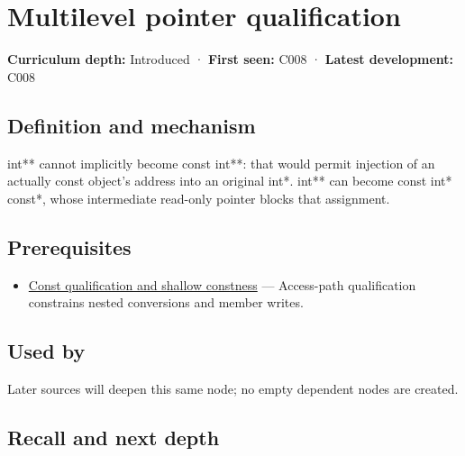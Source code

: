 \hypertarget{appendix-5e1a7561cd98}{}\label{referencestart:appendix-5e1a7561cd98}
\section{Multilevel pointer qualification}\label{appendix-5e1a7561cd98-multilevel-pointer-qualification}

\textbf{Curriculum depth:} Introduced · \textbf{First seen:} C008 · \textbf{Latest development:} C008

\begin{allmightroledefinition}

\subsection{Definition and mechanism}\label{appendix-5e1a7561cd98-definition-and-mechanism}

int** cannot implicitly become const int**: that would permit injection of an actually const object's address into an original int*. int** can become const int* const*, whose intermediate read-only pointer blocks that assignment.

\end{allmightroledefinition}

\subsection{Prerequisites}\label{appendix-5e1a7561cd98-prerequisites}

\begin{itemize}
\tightlist
\item
  \hyperref[appendix-c25d60fed375]{Const qualification and shallow constness} --- Access-path qualification constrains nested conversions and member writes.
\end{itemize}

\subsection{Used by}\label{appendix-5e1a7561cd98-used-by}

Later sources will deepen this same node; no empty dependent nodes are created.

\subsection{Recall and next depth}\label{appendix-5e1a7561cd98-recall-and-next-depth}


